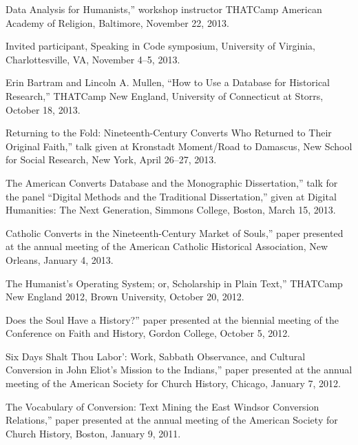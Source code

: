 \documentclass[11pt]{article}
\begin{document}
\noindent{}Data Analysis for Humanists,'' workshop instructor THATCamp American Academy of Religion, Baltimore, November 22, 2013.

Invited participant, Speaking in Code symposium, University of Virginia, Charlottesville, VA, November 4--5, 2013.

Erin Bartram and Lincoln A. Mullen, ``How to Use a Database for Historical Research,'' THATCamp New England, University of Connecticut at Storrs, October 18, 2013.

\noindent{}Returning to the Fold: Nineteenth-Century Converts Who Returned to Their Original Faith,'' talk given at Kronstadt Moment/Road to Damascus, New School for Social Research, New York, April 26--27, 2013.

\noindent{}The American Converts Database and the Monographic Dissertation,'' talk for the panel ``Digital Methods and the Traditional Dissertation,'' given at Digital Humanities: The Next Generation, Simmons College, Boston, March 15, 2013.

\noindent{}Catholic Converts in the Nineteenth-Century Market of Souls,'' paper presented at the annual meeting of the American Catholic Historical Association, New Orleans, January 4, 2013.

\noindent{}The Humanist's Operating System; or, Scholarship in Plain Text,'' THATCamp New England 2012, Brown University, October 20, 2012.

\noindent{}Does the Soul Have a History?'' paper presented at the biennial meeting of the Conference on Faith and History, Gordon College, October 5, 2012.

\noindent{}Six Days Shalt Thou Labor': Work, Sabbath Observance, and Cultural Conversion in John Eliot's Mission to the Indians,'' paper presented at the annual meeting of the American Society for Church History, Chicago, January 7, 2012.

\noindent{}The Vocabulary of Conversion: Text Mining the East Windsor Conversion Relations,'' paper presented at the annual meeting of the American Society for Church History, Boston, January 9, 2011.


\end{document}
